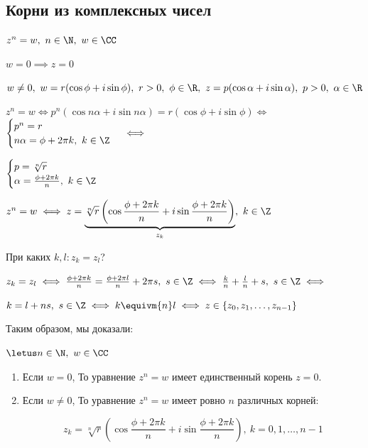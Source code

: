\subsection{Корни из комплексных чисел}

$z^n = w,~n \in \N,~w \in \CC$

$w = 0 \implies z = 0$

$w \neq 0,~w = r (\cos \phi + i \sin \phi),~r > 0,~\phi \in \R,~z = p (\cos \alpha + i \sin \alpha),~p > 0,~\alpha \in \R$

$z^n = w \iff p^n (\cos n \alpha + i \sin n \alpha) = r (\cos \phi + i \sin \phi) \iff$
$\begin{cases}
    p^n = r\\
    n \alpha = \phi + 2 \pi k,~k \in \Z
\end{cases} \iff$

$\begin{cases}
    p = \sqrt[n]{r}\\
    \alpha = \frac{\phi + 2 \pi k}{n},~k \in \Z
\end{cases}$

$z^n = w \iff z = \underbrace{\sqrt[n]{r} \left(\cos \frac{\phi + 2 \pi k}{n} + i \sin \frac{\phi + 2 \pi k}{n}\right)}_{z_k},~k \in \Z$

При каких $k, l: z_k = z_l$?

$z_k = z_l \iff \frac{\phi + 2 \pi k}{n} = \frac{\phi + 2 \pi l}{n} + 2 \pi s,~s \in \Z \iff \frac{k}{n} + \frac{l}{n} + s,~s \in \Z \iff $  

$k = l + ns,~s \in \Z \iff k \equivm{n} l \iff z \in \{z_0, z_1, \ldots, z_{n-1}\}$

Таким образом, мы доказали:

\begin{theorem}
    $\letus n \in \N,~w \in \CC$

    \begin{enumerate}
        \item Если $w = 0$, То уравнение $z^n = w$ имеет единственный корень $z = 0$.
        
        \item Если $w \neq 0$, То уравнение $z^n = w$ имеет ровно $n$ различных корней:
    
        \[ z_k = \sqrt[n]{r} \left(\cos \frac{\phi + 2 \pi k}{n} + i \sin \frac{\phi + 2 \pi k}{n}\right),~k = 0, 1, \ldots, n-1 \]

    \end{enumerate}
\end{theorem}

